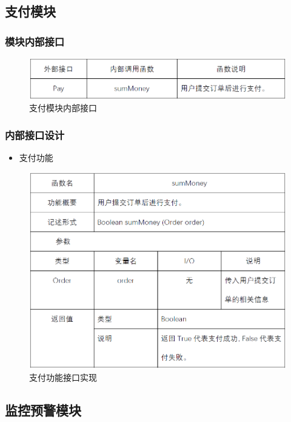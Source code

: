 \subsection{支付模块}
\subsubsection{模块内部接口}
\begin{figure}[!htbp]
	\centering
	\includegraphics[scale=0.75]{image/b13.png} %
	\caption{支付模块内部接口} %
\end{figure}
\subsubsection{内部接口设计}
\begin{itemize}
	\item 支付功能
\end{itemize}
\begin{figure}[!htbp]
	\centering
	\includegraphics[scale=0.75]{image/b14.png} %
	\caption{支付功能接口实现} %
\end{figure}
\subsection{监控预警模块}

